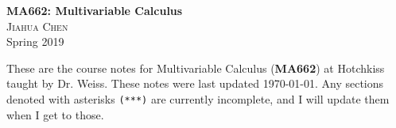 \documentclass[12pt, letterpaper, dvipsnames]{article} %
\begin{document}
\thispagestyle{empty}
\begin{center}\large \textbf{MA662: Multivariable Calculus} \\[12pt]

	\small \textsc{Jiahua Chen}	\\[12pt]
	
	Spring 2019\end{center}
	\vspace{2em}
	
	\begin{changemargin}{.7in}{.7in} 
	These are the course notes for Multivariable Calculus (\textbf{MA662}) at Hotchkiss taught by Dr. Weiss. These notes were last updated \today. Any sections denoted with asterisks \texttt{(***)} are currently incomplete, and I will update them when I get to those.  
	\end{changemargin}
	




















\end{document}
